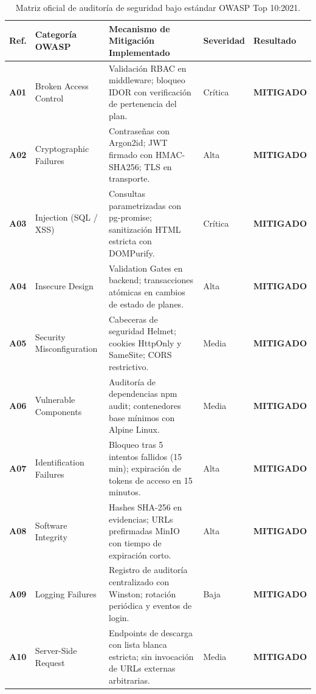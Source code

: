 \documentclass[12pt,a4paper]{article}
\begin{document}
\begin{table}[H]
\centering
\small
\renewcommand{\arraystretch}{1.2}
\begin{tabularx}{\textwidth}{|>{\hsize=0.4\hsize\centering\arraybackslash\bfseries\footnotesize}X|>{\hsize=0.9\hsize\raggedright\arraybackslash\footnotesize}X|>{\hsize=1.7\hsize\raggedright\arraybackslash\footnotesize}X|>{\hsize=0.5\hsize\centering\arraybackslash\footnotesize}X|>{\hsize=0.5\hsize\centering\arraybackslash\footnotesize}X|}
\hline
\rowcolor{tableheader}
\textbf{Ref.} & \textbf{Categoría OWASP} & \textbf{Mecanismo de Mitigación Implementado} & \textbf{Severidad} & \textbf{Resultado} \\
\hline
A01 & Broken Access Control & Validación RBAC en middleware; bloqueo IDOR con verificación de pertenencia del plan. & Crítica & \textbf{MITIGADO} \\
\hline
A02 & Cryptographic Failures & Contraseñas con Argon2id; JWT firmado con HMAC-SHA256; TLS en transporte. & Alta & \textbf{MITIGADO} \\
\hline
A03 & Injection (SQL / XSS) & Consultas parametrizadas con pg-promise; sanitización HTML estricta con DOMPurify. & Crítica & \textbf{MITIGADO} \\
\hline
A04 & Insecure Design & Validation Gates en backend; transacciones atómicas en cambios de estado de planes. & Alta & \textbf{MITIGADO} \\
\hline
A05 & Security Misconfiguration & Cabeceras de seguridad Helmet; cookies HttpOnly y SameSite; CORS restrictivo. & Media & \textbf{MITIGADO} \\
\hline
A06 & Vulnerable Components & Auditoría de dependencias npm audit; contenedores base mínimos con Alpine Linux. & Media & \textbf{MITIGADO} \\
\hline
A07 & Identification Failures & Bloqueo tras 5 intentos fallidos (15 min); expiración de tokens de acceso en 15 minutos. & Alta & \textbf{MITIGADO} \\
\hline
A08 & Software Integrity & Hashes SHA-256 en evidencias; URLs prefirmadas MinIO con tiempo de expiración corto. & Alta & \textbf{MITIGADO} \\
\hline
A09 & Logging Failures & Registro de auditoría centralizado con Winston; rotación periódica y eventos de login. & Baja & \textbf{MITIGADO} \\
\hline
A10 & Server-Side Request & Endpoints de descarga con lista blanca estricta; sin invocación de URLs externas arbitrarias. & Media & \textbf{MITIGADO} \\
\hline
\end{tabularx}
\caption{Matriz oficial de auditoría de seguridad bajo estándar OWASP Top 10:2021.}
\label{tab:owasp_matrix}
\end{table}
\end{document}
